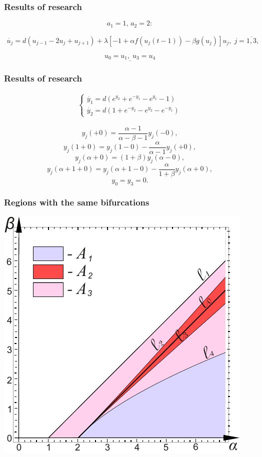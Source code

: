\documentclass[fullscreen=true, unicode, bookmarks=false]{beamer}
\begin{document}
\begin{frame}
\frametitle{Results of research} 

$$ a_1 = 1, \, a_2 = 2: $$

\begin{eqnarray}
	\dot{u_j} = d(u_{j-1}-2u_j+u_{j+1})+\lambda[-1+\alpha f(u_j(t-1)) - \beta g(u_j)]u_j, \; j=\overline{1,3}, \nonumber
\end{eqnarray}		

$$ \underline{u_0=u_1, \; u_3=u_4} $$

\end{frame}

\begin{frame}
\frametitle{Results of research} 

$$
\begin{array}{l}
\begin{cases}
\dot{y_1} = d(e^{y_2} + e^{-y_1} - e^{y_1} - 1) \\
\dot{y_2} = d(1 + e^{-y_2} - e^{y_2} - e^{-y_1})
\end{cases}
\end{array}
$$

\medskip

$$ y_j(+0) = \frac{\alpha -1}{\alpha - \beta - 1}y_j(-0), $$
$$ y_j(1+0) = y_j(1-0) - \frac{\alpha}{\alpha - 1}y_j(+0), $$
$$ y_j(\alpha + 0) = (1 + \beta)y_j(\alpha - 0), $$
$$ y_j(\alpha + 1 + 0) = y_j(\alpha + 1 - 0) - \frac{\alpha}{1 + \beta}y_j(\alpha + 0), $$
$$ y_0 = y_3 = 0.  $$

\end{frame}

\begin{frame}
\frametitle{Regions with the same bifurcations} 
\begin{center}
  \includegraphics[scale=0.9]{Areas_neuman.pdf}  
 \end{center}
\end{frame}
\end{document}
